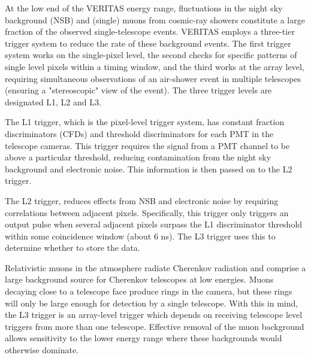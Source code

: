 \documentclass[main.tex]{subfiles}
\begin{document}
At the low end of the VERITAS energy range, fluctuations in the night sky background (NSB) and (single) muons from cosmic-ray showers constitute a large fraction of the observed single-telescope events. VERITAS employs a three-tier trigger system to reduce the rate of these background events. The first trigger system works on the single-pixel level, the second checks for specific patterns of single level pixels within a timing window, and the third works at the array level, requiring simultaneous observations of an air-shower event in multiple telescopes (ensuring a "stereoscopic" view of the event). The three trigger levels are designated L1, L2 and L3.\par

The L1 trigger, which is the pixel-level trigger system, has constant fraction discriminators (CFDs) and threshold discriminators for each PMT in the telescope cameras. This trigger requires the signal from a PMT channel to be above a particular threshold, reducing contamination from the night sky background and electronic noise. This information is then passed on to the L2 trigger.

The L2 trigger, reduces effects from NSB and electronic noise by requiring correlations between adjacent pixels. Specifically, this trigger only triggers an output pulse when several adjacent pixels surpass the L1 discriminator threshold within some coincidence window (about 6 ns). The L3 trigger uses this to determine whether to store the data.

Relativistic muons in the atmosphere radiate Cherenkov radiation and comprise a large background source for Cherenkov telescopes at low energies. Muons decaying close to a telescope face produce rings in the camera, but these rings will only be large enough for detection by a single telescope. With this in mind, the L3 trigger is an array-level trigger which depends on receiving telescope level triggers from more than one telescope. Effective removal of the muon background allows sensitivity to the lower energy range where these backgrounds would otherwise dominate.
\end{document}
